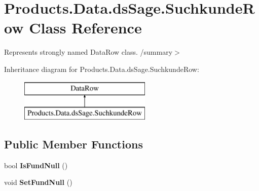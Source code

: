 \hypertarget{class_products_1_1_data_1_1ds_sage_1_1_suchkunde_row}{}\section{Products.\+Data.\+ds\+Sage.\+Suchkunde\+Row Class Reference}
\label{class_products_1_1_data_1_1ds_sage_1_1_suchkunde_row}


Represents strongly named Data\+Row class. /summary$>$  


Inheritance diagram for Products.\+Data.\+ds\+Sage.\+Suchkunde\+Row\+:\begin{figure}[H]
\begin{center}
\leavevmode
\includegraphics[height=2.000000cm]{class_products_1_1_data_1_1ds_sage_1_1_suchkunde_row}
\end{center}
\end{figure}
\subsection*{Public Member Functions}
\begin{DoxyCompactItemize}
\item 
bool {\bfseries Is\+Fund\+Null} ()\hypertarget{class_products_1_1_data_1_1ds_sage_1_1_suchkunde_row_a8c09a409d41ee052e5436bb66d92bfab}{}\label{class_products_1_1_data_1_1ds_sage_1_1_suchkunde_row_a8c09a409d41ee052e5436bb66d92bfab}

\item 
void {\bfseries Set\+Fund\+Null} ()\hypertarget{class_products_1_1_data_1_1ds_sage_1_1_suchkunde_row_adcb86df74b5d72bbbb63dfd55c22c9e6}{}\label{class_products_1_1_data_1_1ds_sage_1_1_suchkunde_row_adcb86df74b5d72bbbb63dfd55c22c9e6}

\end{DoxyCompactItemize}
